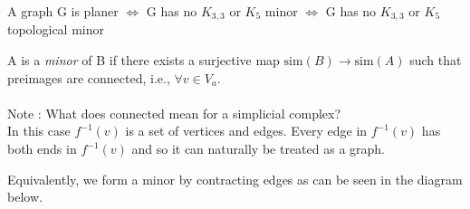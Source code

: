 \documentclass{article}
\def\sim{\text{sim}}
\begin{document}
\begin{definition}
A graph G is planer $\iff$ G has no $K_{3,3}$ or $K_5$ minor $\iff$ G has no $K_{3,3}$ or $K_5$ topological minor
\end{definition}

\begin{definition}
A is a \textit{minor} of B if there exists a surjective map $\sim(B) \to \sim(A)$ such that preimages are connected, i.e., $\forall v \in V_{a}$. \\
\\ Note :  What does connected mean for a simplicial complex?
\\ In this case $f^{-1}(v)$ is a set of vertices and edges. Every edge in $f^{-1}(v)$ has both ends in $f^{-1}(v)$ and so it can naturally be treated as a graph. 
\end{definition}
\begin{example}
Equivalently, we form a minor by contracting edges as can be seen in the diagram below.
\end{example}
\end{document}
